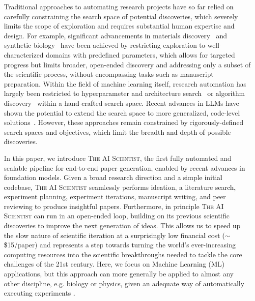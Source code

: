 \documentclass[11pt, a4paper]{include/gdm_format}
\newcommand{\ouralgo}{\textsc{The AI Scientist}\xspace}
\begin{document}
%
Traditional approaches to automating research projects have so far relied on carefully constraining the search space of potential discoveries, which severely limits the scope of exploration and requires substantial human expertise and design.
For example, significant advancements in materials discovery~\citep{pyzer2022alphamaterials,merchant2023scaling,szymanski2023autonomous} and synthetic biology~\citep{jumper2021alphafold,hayes2024simulating} have been achieved by restricting exploration to well-characterized domains with predefined parameters, which allows for targeted progress but limits broader, open-ended discovery and addressing only a subset of the scientific process, without encompassing tasks such as manuscript preparation.
Within the field of machine learning itself, research automation has largely been restricted to hyperparameter and architecture search~\citep{he2021automl, hutter2019automated, wan2021think,lu2022revisiting,bgpbt} or algorithm discovery~\citep{metz2022velo, lange2023discovering_es, lange2023discovering_ga, lu2022discovered, kirsch2019improving, chen2024symbolic, alet2020meta} within a hand-crafted search space.
Recent advances in LLMs have shown the potential to extend the search space to more generalized, code-level solutions~\citep{ma2023eureka, lu2024discovering, omniepic, lehman2022evolutionlargemodels}.
However, these approaches remain constrained by rigorously-defined search spaces and objectives, which limit the breadth and depth of possible discoveries.

%
In this paper, we introduce \ouralgo, the first fully automated and scalable pipeline for end-to-end paper generation, enabled by recent advances in foundation models.
Given a broad research direction and a simple initial codebase, \ouralgo seamlessly performs ideation, a literature search, experiment planning, experiment iterations, manuscript writing, and peer reviewing to produce insightful papers.
Furthermore, in principle \ouralgo can run in an open-ended loop, building on its previous scientific discoveries to improve the next generation of ideas.
This allows us to speed up the slow nature of scientific iteration at a surprisingly low financial cost ($\sim$\$15/paper) and represents a step towards turning the world's ever-increasing computing resources into the scientific breakthroughs needed to tackle the core challenges of the 21st century.
Here, we focus on Machine Learning (ML) applications, but this approach can more generally be applied to almost any other discipline, e.g. biology or physics, given an adequate way of automatically executing experiments \citep{kehoe2015survey, arnold2022cloud, zucchelli2021highly}.
%
%
\end{document}
